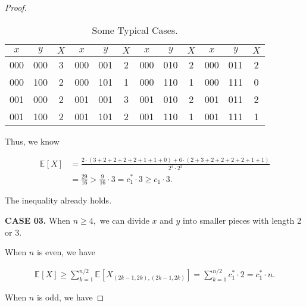 \documentclass{article}
\newcommand{\staExp}[2]{\mathbb{E}_{#1}\left[#2\right]}
\begin{document}
\begin{proof}
    \begin{table}[htbp]
    \centering
    \begin{tabular}{ccc|ccc|ccc|ccc}
        \hline
        $x$ & $y$ & $X$ & $x$ & $y$ & $X$ & $x$ & $y$ & $X$ & $x$ & $y$ & $X$ \\
        \hline 
        000 & 000 & 3 & 000 & 001 & 2 & 000 & 010 & 2 & 000 & 011 & 2 \\
        000 & 100 & 2 & 000 & 101 & 1 & 000 & 110 & 1 & 000 & 111 & 0 \\
        \hline
        001 & 000 & 2 & 001 & 001 & 3 & 001 & 010 & 2 & 001 & 011 & 2 \\
        001 & 100 & 2 & 001 & 101 & 2 & 001 & 110 & 1 & 001 & 111 & 1 \\
        \hline
    \end{tabular}
    \caption{Some Typical Cases.}
    \end{table}
    
    \vspace{-1em} \hspace{1.3em}
    Thus, we know
    
    \vspace{-2.5em}
    \begin{align*}
        \staExp{}{X} &=\frac{2\cdot(3+2+2+2+2+1+1+0)+6\cdot(2+3+2+2+2+2+1+1)}{2^3\cdot2^3} \\
        &=\frac{29}{16} > \frac{9}{16}\cdot 3 = c_1^*\cdot 3 \geq c_1\cdot 3.
    \end{align*}
    
    \vspace{-0.5em} \hspace{1.3em}
    The inequality already holds.
    
    \vspace{2.5em} \hspace{1.3em}
    \textbf{CASE 03.} When $n\geq 4,$ we can divide $x$ and $y$ into smaller pieces with length 2 or 3. 
    
    \hspace{1.3em}
    When $n$ is even, we have
    
    \vspace{-2.8em}
    \begin{align*}
        \staExp{}{X} \geq \sum_{k=1}^{n/2}\staExp{}{X_{(2k-1,2k),(2k-1,2k)}} = \sum_{k=1}^{n/2}c_1^*\cdot 2 =  c_1^*\cdot n.
    \end{align*}
    
    \vspace{-0.75em} \hspace{1.3em}
    When $n$ is odd, we have
    

\end{proof}
\end{document}
